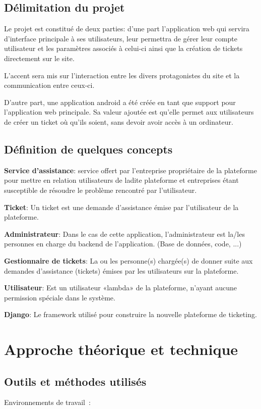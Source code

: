 \documentclass{report}
\begin{document}
\section{Délimitation du projet}
Le projet est constitué de deux parties: d'une part l'application web qui servira d'interface principale à ses utilisateurs, leur permettra de gérer leur compte utilisateur et les paramètres associés à celui-ci ainsi que la création de tickets directement sur le site.

L'accent sera mis sur l'interaction entre les divers protagonistes du site et la communication entre ceux-ci.

D'autre part, une application android a été créée en tant que support pour l'application web principale. Sa valeur ajoutée est qu'elle permet aux utilisateurs de créer un ticket où qu'ils soient, sans devoir avoir accès à un ordinateur.


\section{Définition de quelques concepts}
\textbf{Service d'assistance}: service offert par l'entreprise propriétaire de la plateforme pour mettre en relation utilisateurs de ladite plateforme et entreprises étant susceptible de résoudre le problème rencontré par l'utilisateur.

\textbf{Ticket}: Un ticket est une demande d'assistance émise par l'utilisateur de la plateforme.

\textbf{Administrateur}: Dans le cas de cette application, l'administrateur est la/les personnes en charge du backend de l'application. (Base de données, code, ...)

\textbf{Gestionnaire de tickets}: La ou les personne(s) chargée(s) de donner suite aux demandes d'assistance (tickets) émises par les utilisateurs sur la plateforme.

\textbf{Utilisateur}: Est un utilisateur «lambda» de la plateforme, n'ayant aucune permission spéciale dans le système.

\textbf{Django}: Le framework utilisé pour construire la nouvelle plateforme de ticketing.


\chapter{Approche théorique et technique}
\section{Outils et méthodes utilisés}
Environnements de travail :
\end{document}

